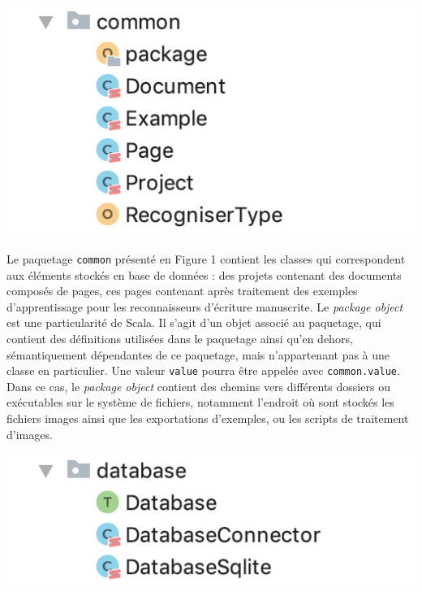 \begin{mdframed}[frametitle={Figure 1 : Paquetage \texttt{common}}, innerbottommargin=10]
\begin{center}
\includegraphics[scale=0.7]{assets/common.png}
\end{center}
\end{mdframed}

\paragraph{}
Le paquetage \texttt{common} présenté en Figure 1 contient les classes qui correspondent aux éléments stockés en base de données : des projets contenant des documents composés de pages, ces pages contenant après traitement des exemples d'apprentissage pour les reconnaisseurs d'écriture manuscrite. Le \textit{package object} est une particularité de Scala. Il s'agit d'un objet associé au paquetage, qui contient des définitions utilisées dans le paquetage ainsi qu'en dehors, sémantiquement dépendantes de ce paquetage, mais n'appartenant pas à une classe en particulier. Une valeur \texttt{value} pourra être appelée avec \texttt{common.value}. Dans ce cas, le \textit{package object} contient des chemins vers différents dossiers ou exécutables sur le système de fichiers, notamment l'endroit où sont stockés les fichiers images ainsi que les exportations d'exemples, ou les scripts de traitement d'images.

\begin{mdframed}[frametitle={Figure 2 : Paquetage \texttt{database}}, innerbottommargin=10]
\begin{center}
\includegraphics[scale=0.7]{assets/database.png}
\end{center}
\end{mdframed}

